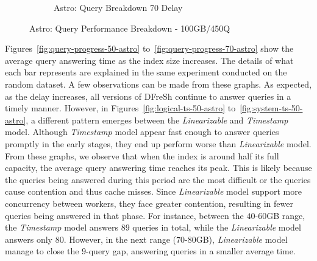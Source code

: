 \begin{figure}
\begin{subfigure}[c]{0.48\textwidth}
		\caption{Astro: Query Breakdown 70 Delay}
		\label{fig:actual-query-breakdown-70-astro}
	\end{subfigure}
	\caption{Astro: Query Performance Breakdown - 100GB/450Q}
	\label{fig:dfresh-query-breakdown-astro}
\end{figure}

%
Figures~\ref{fig:query-progress-50-astro} to~\ref{fig:query-progress-70-astro} show 
the average query answering time as the index size increases. The details of what each
bar represents are explained in the same experiment conducted on the random dataset.
A few observations can be made from these graphs. As expected, as the delay increases,
all versions of DFreSh continue to answer queries in a timely manner. However, in
Figures~\ref{fig:logical-ts-50-astro} to~\ref{fig:system-ts-50-astro}, a different
pattern emerges between the \textit{Linearizable} and \textit{Timestamp} model. Although
\textit{Timestamp} model appear fast enough to answer queries promptly in the early
stages, they end up perform worse than \textit{Linearizable} model.
%
From these graphs, we observe that when the index is around half its full capacity,
the average query answering time reaches its peak. This is likely because the queries
being answered during this period are the most difficult or the queries cause contention
and thus cache misses. Since \textit{Linearizable} model support more concurrency
between workers, they face greater contention, resulting in fewer queries being
answered in that phase. For instance, between the $40$-$60$GB range, the
\textit{Timestamp} model answers $89$ queries in total, while the \textit{Linearizable}
model answers only $80$. However, in the next range ($70$-$80$GB), \textit{Linearizable}
model manage to close the $9$-query gap, answering queries in a smaller
average time.


